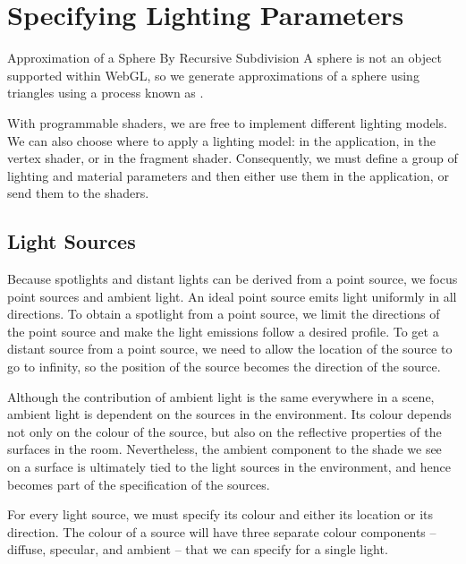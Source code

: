 \documentclass[../COS3712_Notes.tex]{subfiles}
\begin{document}
    \section{Specifying Lighting Parameters}
      \begin{sidenote}[float]{Approximation of a Sphere By Recursive Subdivision}
        A sphere is not an object supported within WebGL, so we generate approximations of a sphere
        using triangles using a process known as .
      \end{sidenote}

      With programmable shaders, we are free to implement different lighting models.
      We can also choose where to apply a lighting model: in the application,
      in the vertex shader, or in the fragment shader.
      Consequently, we must define a group of lighting and material parameters
      and then either use them in the application, or send them to the shaders.

      \subsection{Light Sources}
        Because spotlights and distant lights can be derived from a point source,
        we focus point sources and ambient light.
        An ideal point source emits light uniformly in all directions.
        To obtain a spotlight from a point source, we limit the directions of the point
        source and make the light emissions follow a desired profile.
        To get a distant source from a point source, we need to allow the location of the source
        to go to infinity, so the position of the source becomes the direction of the source.

        Although the contribution of ambient light is the same everywhere in a scene,
        ambient light is dependent on the sources in the environment.
        Its colour depends not only on the colour of the source, but also on the reflective
        properties of the surfaces in the room.
        Nevertheless, the ambient component to the shade we see on a surface is ultimately
        tied to the light sources in the environment,
        and hence becomes part of the specification of the sources.

        For every light source, we must specify its colour and either its location or its
        direction.
        The colour of a source will have three separate colour components
        -- diffuse, specular, and ambient --
        that we can specify for a single light.
\end{document}
